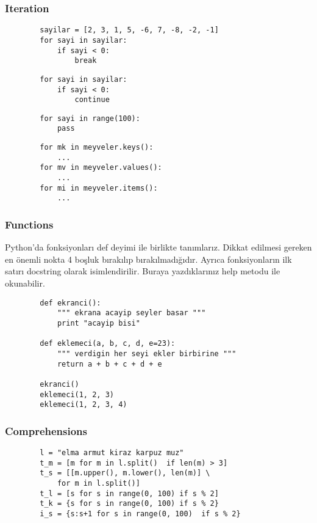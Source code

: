 \documentclass[10pt, compress]{beamer}
\begin{document}
\begin{frame}[fragile]
\frametitle{Iteration}    
    \begin{verbatim}
        sayilar = [2, 3, 1, 5, -6, 7, -8, -2, -1]
        for sayi in sayilar:
            if sayi < 0:
                break
    \end{verbatim}   

    \begin{verbatim}
        for sayi in sayilar:
            if sayi < 0:
                continue
    \end{verbatim} 
    
    \begin{verbatim}
        for sayi in range(100):
            pass
    \end{verbatim} 
    
    \begin{verbatim}
        for mk in meyveler.keys():
            ...
        for mv in meyveler.values():
            ...
        for mi in meyveler.items():
            ...
    \end{verbatim}     
\end{frame}

\begin{frame}[fragile]
\frametitle{Functions}    
    Python'da fonksiyonları \alert{def} deyimi ile birlikte tanımlarız. Dikkat edilmesi gereken en önemli nokta \alert{4 boşluk} bırakılıp bırakılmadığıdır. Ayrıca fonksiyonların ilk satırı \alert{docstring} olarak isimlendirilir. Buraya yazdıklarınız \alert{help} metodu ile okunabilir.
    \begin{verbatim}
        def ekranci():
            """ ekrana acayip seyler basar """
            print "acayip bisi"
        
        def eklemeci(a, b, c, d, e=23):
            """ verdigin her seyi ekler birbirine """
            return a + b + c + d + e
        
        ekranci()
        eklemeci(1, 2, 3)
        eklemeci(1, 2, 3, 4)
    \end{verbatim}     
\end{frame}

\begin{frame}[fragile]
\frametitle{Comprehensions}    
    \noindent\hspace{-10in}
    \begin{verbatim}
        l = "elma armut kiraz karpuz muz"
        t_m = [m for m in l.split()  if len(m) > 3]
        t_s = [[m.upper(), m.lower(), len(m)] \ 
            for m in l.split()]
        t_l = [s for s in range(0, 100) if s % 2]
        t_k = {s for s in range(0, 100) if s % 2} 
        i_s = {s:s+1 for s in range(0, 100)  if s % 2} 
    \end{verbatim}
\end{frame}
\end{document}
